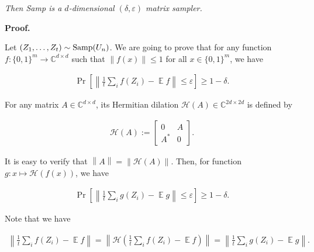 \documentclass[10pt,a4paper]{article}
\begin{document}
\emph{Then Samp is a $d$-dimensional $(\delta,\varepsilon)$ matrix sampler.}\par






\par\medskip\noindent\textbf{Proof.}\par




Let $(Z_{1},\dots,Z_{t})\sim\textup{{Samp}}(U_{n})$.
We are going to prove that for any function $f:\{0,1\}^{m}\to\mathbb{C}^{d\times d}$ such that $\|f(x)\|\leq 1$ for all $x\in\{0,1\}^{m}$, we have\par


\[\begin{gathered}
\Pr\left[\left\lVert\frac{1}{t}\sum_{i}f(Z_{i})-\operatorname*{\mathbb{E}}f\right\rVert\leq\varepsilon\right]\geq 1-\delta.
\end{gathered}\]


For any matrix $A\in\mathbb{C}^{d\times d}$, its Hermitian dilation $\mathcal{H}(A)\in\mathbb{C}^{2d\times 2d}$ is defined by\par


\[\begin{gathered}
\mathcal{H}(A):=\begin{bmatrix}0&A\\
A^{*}&0\end{bmatrix}.
\end{gathered}\]


It is easy to verify that $\left\lVert A\right\rVert=\left\lVert\mathcal{H}(A)\right\rVert$. Then, for function $g:x\mapsto\mathcal{H}(f(x))$, we have\par


\[\begin{gathered}
\Pr\left[\left\lVert\frac{1}{t}\sum_{i}g(Z_{i})-\operatorname*{\mathbb{E}}g\right\rVert\leq\varepsilon\right]\geq 1-\delta.
\end{gathered}\]


Note that we have\par


\[\begin{gathered}
\left\lVert\frac{1}{t}\sum_{i}f(Z_{i})-\operatorname*{\mathbb{E}}f\right\rVert=\left\lVert\mathcal{H}\left(\frac{1}{t}\sum_{i}f(Z_{i})-\operatorname*{\mathbb{E}}f\right)\right\rVert=\left\lVert\frac{1}{t}\sum_{i}g(Z_{i})-\operatorname*{\mathbb{E}}g\right\rVert.
\end{gathered}\]
\end{document}
